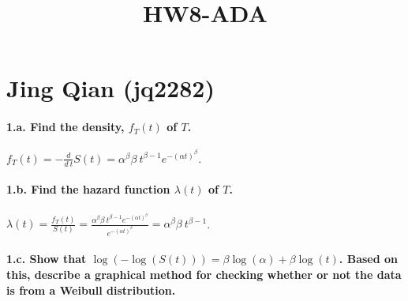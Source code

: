 \documentclass[]{article}
\title{HW8-ADA}
\author{}
\date{}
\let\oldparagraph\paragraph
\renewcommand{\paragraph}[1]{\oldparagraph{#1}\mbox{}}
\begin{document}
\maketitle

\hypertarget{jing-qian-jq2282}{%
\section{Jing Qian (jq2282)}\label{jing-qian-jq2282}}

\hypertarget{a.-find-the-density-f_tt-of-t.}{%
\paragraph{\texorpdfstring{1.a. Find the density, \(f_T(t)\) of
\(T\).}{1.a. Find the density, f\_T(t) of T.}}\label{a.-find-the-density-f_tt-of-t.}}

\(f_T(t) = -\frac{d}{d\ t}S(t) = \alpha^{\beta}\beta\ t^{\beta-1} e^{-(\alpha t)^{\beta}}\).

\hypertarget{b.-find-the-hazard-function-lambdat-of-t.}{%
\paragraph{\texorpdfstring{1.b. Find the hazard function \(\lambda(t)\)
of
\(T\).}{1.b. Find the hazard function \textbackslash{}lambda(t) of T.}}\label{b.-find-the-hazard-function-lambdat-of-t.}}

\(\lambda (t) = \frac{f_T(t)}{S(t)} = \frac{\alpha^{\beta}\beta\ t^{\beta-1} e^{-(\alpha t)^{\beta}}}{e^{-(\alpha t)^{\beta}}} = \alpha^{\beta}\beta\ t^{\beta-1}\).

\hypertarget{c.-show-that-loglogst-beta-logalpha-beta-logt.-based-on-this-describe-a-graphical-method-for-checking-whether-or-not-the-data-is-from-a-weibull-distribution.}{%
\paragraph{\texorpdfstring{1.c. Show that
\(\log(−\log(S(t))) = \beta \log(\alpha) + \beta \log(t)\). Based on
this, describe a graphical method for checking whether or not the data
is from a Weibull
distribution.}{1.c. Show that \textbackslash{}log(−\textbackslash{}log(S(t))) = \textbackslash{}beta \textbackslash{}log(\textbackslash{}alpha) + \textbackslash{}beta \textbackslash{}log(t). Based on this, describe a graphical method for checking whether or not the data is from a Weibull distribution.}}\label{c.-show-that-loglogst-beta-logalpha-beta-logt.-based-on-this-describe-a-graphical-method-for-checking-whether-or-not-the-data-is-from-a-weibull-distribution.}}
\end{document}

